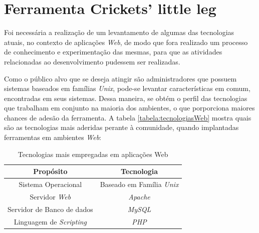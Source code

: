 \chapter{Ferramenta Crickets' little leg}\label{2_ferramenta_cll}

Foi necessária a realização de um levantamento de algumas das tecnologias atuais, no contexto de aplicações \textit{Web}, de modo que fora realizado um processo de conhecimento e experimentação das mesmas, para que as atividades relacionadas ao desenvolvimento pudessem ser realizadas.

Como o público alvo que se deseja atingir são administradores que possuem sistemas baseados em famílias \textit{Unix}, pode-se levantar características em comum, encontradas em seus sistemas. Dessa maneira, se obtém o perfil das tecnologias que trabalham em conjunto na maioria dos ambientes, o que porporciona maiores chances de adesão da ferramenta. A tabela \ref{tabela:tecnologiasWeb} mostra quais são as tecnologias mais aderidas perante à comunidade, quando implantadas ferramentas em ambientes \textit{Web}:

\begin{table}[ht]
    \centering
    \caption{\label{tabela:tecnologiasWeb}Tecnologias mais empregadas em aplicações Web}

    \begin{tabular}{c c}
        \hline
        \hline

        Propósito & Tecnologia\\ [0.5ex]
        \hline

        Sistema Operacional & Baseado em Família \textit{Unix}\\

        Servidor \textit{Web} & \textit{Apache} \footnotemark[1]\\

        Servidor de Banco de dados & \textit{MySQL} \footnotemark[2]\\

        Linguagem de \textit{Scripting} & \textit{PHP} \footnotemark[3]\\ [0.1ex]
        \hline
    \end{tabular}
    \label{webapptech}
\end{table}


